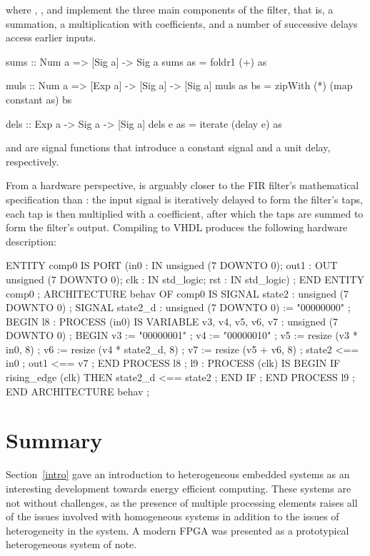 \documentclass[../paper.tex]{subfiles}
\begin{document}
\noindent where , , and  implement the three main components of the filter, that is, a summation, a multiplication with coefficients, and a number of successive delays access earlier inputs.

\begin{code}
sums :: Num a => [Sig a] -> Sig a
sums as = foldr1 (+) as

muls :: Num a => [Exp a] -> [Sig a] -> [Sig a]
muls as bs = zipWith (*) (map constant as) bs

dels :: Exp a -> Sig a -> [Sig a]
dels e as = iterate (delay e) as
\end{code}

\noindent {} and  are signal functions that introduce a constant signal and a unit delay, respectively.

From a hardware perspective,  is arguably closer to the FIR filter's mathematical specification than : the input signal is iteratively delayed to form the filter's taps, each tap is then multiplied with a coefficient, after which the taps are summed to form the filter's output. Compiling  to VHDL produces the following hardware description:

\begin{code}
ENTITY comp0 IS
  PORT (in0 : IN unsigned (7 DOWNTO 0);
        out1 : OUT unsigned (7 DOWNTO 0);
        clk : IN std_logic;
        rst : IN std_logic) ;
END ENTITY comp0 ;
ARCHITECTURE behav OF comp0 IS
  SIGNAL state2 : unsigned (7 DOWNTO 0) ;
  SIGNAL state2_d : unsigned (7 DOWNTO 0) := "00000000" ;
BEGIN
  l8 :
    PROCESS (in0) IS
      VARIABLE v3, v4, v5, v6, v7 : unsigned (7 DOWNTO 0) ; 
    BEGIN
      v3 := "00000001" ;
      v4 := "00000010" ;
      v5 := resize (v3 * in0, 8) ;
      v6 := resize (v4 * state2_d, 8) ;
      v7 := resize (v5 + v6, 8) ;
      state2 <== in0 ;
      out1 <== v7 ;
    END PROCESS l8 ;
  l9 :
    PROCESS (clk) IS
    BEGIN
      IF rising_edge (clk) THEN
        state2_d <== state2 ;
      END IF ;
    END PROCESS l9 ;
END ARCHITECTURE behav ;
\end{code}

\section{Summary}

Section~\ref{intro} gave an introduction to heterogeneous embedded systems as an interesting development towards energy efficient computing. These systems are not without challenges, as the presence of multiple processing elements raises all of the issues involved with homogeneous systems in addition to the issues of heterogeneity in the system. A modern FPGA was presented as a prototypical heterogeneous system of note.
\end{document}
